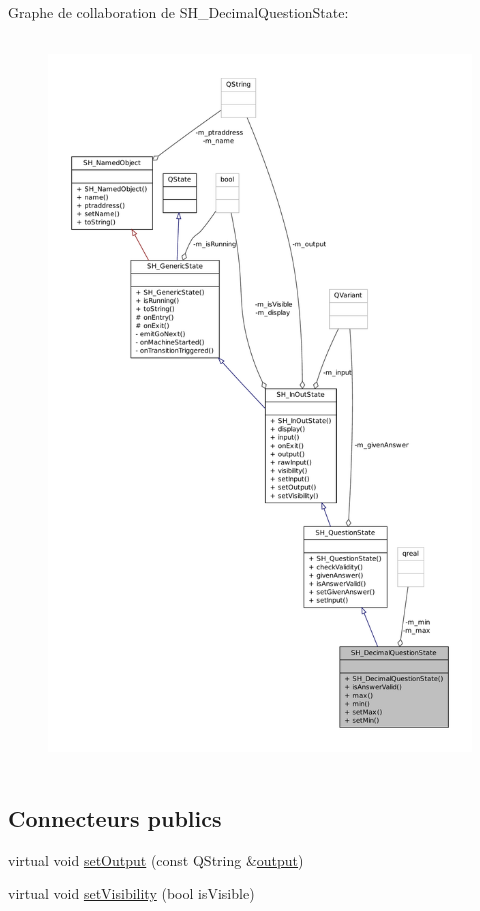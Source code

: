 Graphe de collaboration de S\-H\-\_\-\-Decimal\-Question\-State\-:
\nopagebreak
\begin{figure}[H]
\begin{center}
\leavevmode
\includegraphics[height=550pt]{classSH__DecimalQuestionState__coll__graph}
\end{center}
\end{figure}
\subsection*{Connecteurs publics}
\begin{DoxyCompactItemize}
\item 
virtual void \hyperlink{classSH__InOutState_af611c84134e262739cd834797b315c80}{set\-Output} (const Q\-String \&\hyperlink{classSH__InOutState_a17ed7eaf5e3ed5af80a4f9fe65d5bfd9}{output})
\item 
virtual void \hyperlink{classSH__InOutState_a7fdfaa6f600f0ac4a96f238a038ba9ad}{set\-Visibility} (bool is\-Visible)
\end{DoxyCompactItemize}
